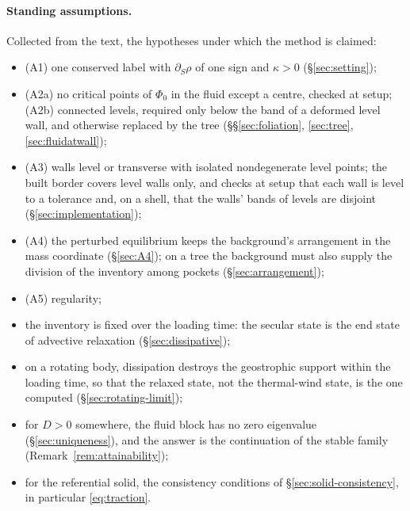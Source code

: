 \documentclass[11pt]{article}
\theoremstyle{definition}
\theoremstyle{remark}
\begin{document}
\paragraph{Standing assumptions.} Collected from the text, the
hypotheses under which the method is claimed:
\begin{itemize}
\item (A1) one conserved label with $\partial_S\rho$ of one sign and
  $\kappa > 0$ (\S\ref{sec:setting});
\item (A2a) no critical points of $\Phi_0$ in the fluid except a centre,
  checked at setup; (A2b) connected levels, required only below the band
  of a deformed level wall, and otherwise replaced by the tree
  (\S\S\ref{sec:foliation}, \ref{sec:tree}, \ref{sec:fluidatwall});
\item (A3) walls level or transverse with isolated nondegenerate level
  points; the built border covers level walls only, and checks at setup
  that each wall is level to a tolerance and, on a shell, that the
  walls' bands of levels are disjoint (\S\ref{sec:implementation});
\item (A4) the perturbed equilibrium keeps the background's arrangement
  in the mass coordinate (\S\ref{sec:A4}); on a tree the background must
  also supply the division of the inventory among pockets
  (\S\ref{sec:arrangement});
\item (A5) regularity;
\item the inventory is fixed over the loading time: the secular state is
  the end state of advective relaxation (\S\ref{sec:dissipative});
\item on a rotating body, dissipation destroys the geostrophic support
  within the loading time, so that the relaxed state, not the
  thermal-wind state, is the one computed (\S\ref{sec:rotating-limit});
\item for $D > 0$ somewhere, the fluid block has no zero eigenvalue
  (\S\ref{sec:uniqueness}), and the answer is the continuation of the
  stable family (Remark~\ref{rem:attainability});
\item for the referential solid, the consistency conditions of
  \S\ref{sec:solid-consistency}, in particular \eqref{eq:traction}.
\end{itemize}
\end{document}
